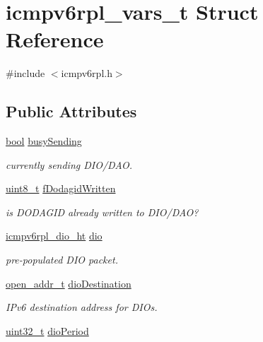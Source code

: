 \hypertarget{structicmpv6rpl__vars__t}{}\section{icmpv6rpl\+\_\+vars\+\_\+t Struct Reference}
\label{structicmpv6rpl__vars__t}


{\ttfamily \#include $<$icmpv6rpl.\+h$>$}

\subsection*{Public Attributes}
\begin{DoxyCompactItemize}
\item 
\hyperlink{_p_e___types_8h_a97a80ca1602ebf2303258971a2c938e2}{bool} \hyperlink{structicmpv6rpl__vars__t_a42b926acc9b45cdbde4dfa18014facd5}{busy\+Sending}
\begin{DoxyCompactList}\small\item\em currently sending D\+I\+O/\+D\+AO. \end{DoxyCompactList}\item 
\hyperlink{_p_e___types_8h_aba7bc1797add20fe3efdf37ced1182c5}{uint8\+\_\+t} \hyperlink{structicmpv6rpl__vars__t_a0a845af4d8ccbba1ee88143cbfca457b}{f\+Dodagid\+Written}
\begin{DoxyCompactList}\small\item\em is D\+O\+D\+A\+G\+ID already written to D\+I\+O/\+D\+AO? \end{DoxyCompactList}\item 
\hyperlink{structicmpv6rpl__dio__ht}{icmpv6rpl\+\_\+dio\+\_\+ht} \hyperlink{structicmpv6rpl__vars__t_aef29142663a295dfcf77c05204af83ed}{dio}
\begin{DoxyCompactList}\small\item\em pre-\/populated D\+IO packet. \end{DoxyCompactList}\item 
\hyperlink{structopen__addr__t}{open\+\_\+addr\+\_\+t} \hyperlink{structicmpv6rpl__vars__t_a259f71b16f9219c3288db599d441c72e}{dio\+Destination}
\begin{DoxyCompactList}\small\item\em I\+Pv6 destination address for D\+I\+Os. \end{DoxyCompactList}\item 
\hyperlink{_p_e___types_8h_a33594304e786b158f3fb30289278f5af}{uint32\+\_\+t} \hyperlink{structicmpv6rpl__vars__t_a0c59f60a251aa855db9b7eea7fb4adda}{dio\+Period}

\end{DoxyCompactItemize}
